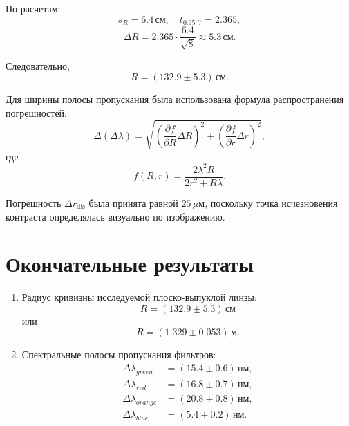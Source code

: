 \documentclass[12pt,a4paper]{article}
\newcommand{\um}{\ensuremath{\,\mu\text{м}}}
\newcommand{\nm}{\ensuremath{\,\text{нм}}}
\newcommand{\cm}{\ensuremath{\,\text{см}}}
\begin{document}
По расчетам:
\begin{equation}
    s_R = 6.4\cm, \quad t_{0.95;7}=2.365,
\end{equation}
\begin{equation}
    \Delta R = 2.365\cdot\frac{6.4}{\sqrt{8}}\approx 5.3\cm.
\end{equation}

Следовательно,
\begin{equation}
    R = (132.9 \pm 5.3)\cm.
\end{equation}

Для ширины полосы пропускания была использована формула распространения погрешностей:
\begin{equation}
    \Delta(\Delta\lambda)=
    \sqrt{\left(\frac{\partial f}{\partial R}\Delta R\right)^2+
    \left(\frac{\partial f}{\partial r}\Delta r\right)^2},
\end{equation}
где
\begin{equation}
    f(R,r)=\frac{2\lambda^2R}{2r^2+R\lambda}.
\end{equation}

Погрешность $\Delta r_{\text{dis}}$ была принята равной $25\um$, поскольку точка исчезновения контраста определялась визуально по изображению.

\section{Окончательные результаты}

\begin{enumerate}
    \item Радиус кривизны исследуемой плоско-выпуклой линзы:
    \begin{equation}
        \boxed{R = (132.9 \pm 5.3)\cm}
    \end{equation}
    или
    \begin{equation}
        \boxed{R = (1.329 \pm 0.053)\,\text{м}}.
    \end{equation}

    \item Спектральные полосы пропускания фильтров:
    \begin{align*}
        \Delta\lambda_{green} &= (15.4 \pm 0.6)\nm,\\
        \Delta\lambda_{red} &= (16.8 \pm 0.7)\nm,\\
        \Delta\lambda_{orange} &= (20.8 \pm 0.8)\nm,\\
        \Delta\lambda_{blue} &= (5.4 \pm 0.2)\nm.
    \end{align*}
\end{enumerate}
\end{document}
